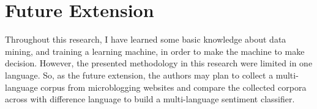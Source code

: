 \documentclass[a4paper,12pt]{article}
\begin{document}
\section*{Future Extension}
Throughout this research, I have learned some basic knowledge about data mining, and training a learning machine, in order to make the machine to make decision. However, the presented methodology in this research were limited in one language. So, as the future extension, the authors may plan to collect a multi-language corpus from microblogging websites and compare the collected corpora across with difference language to build a multi-language sentiment classifier.



\end{document}
